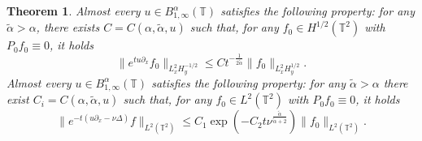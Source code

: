 \documentclass[11pt,oneside,reqno]{amsart}
\newtheorem{theorem}{Theorem}[section]
\numberwithin{equation}{section}
\begin{document}
\begin{theorem}
  Almost every $u \in B^{\alpha}_{1, \infty} (\mathbb{T})$ satisfies the
  following property: for any $\tilde{\alpha} > \alpha$, there exists $C = C
  (\alpha, \tilde{\alpha}, u)$ such that, for any $f_0 \in H^{1 / 2}
  (\mathbb{T}^2)$ with $P_0 f_0 \equiv 0$, it holds
  \begin{equation}
    \| e^{t u \partial_x} f_0 \|_{{L^2_x}  H^{- 1 / 2}_y} \leqslant C t^{-
    \frac{1}{2 \tilde{\alpha}}} \| f_0 \|_{L^2_x H^{1 / 2}_y} .
    \label{eq:final-thm-eq1}
  \end{equation}
  Almost every $u \in B^{\alpha}_{1, \infty} (\mathbb{T})$ satisfies the
  following property: for any $\tilde{\alpha} > \alpha$ there exist $C_i = C
  (\alpha, \tilde{\alpha}, u)$ such that, for any $f_0 \in L^2 (\mathbb{T}^2)$
  with $P_0 f_0 \equiv 0$, it holds
  \begin{equation}
    \| e^{- t (u \partial_x - \nu \Delta)} f \|_{L^2 (\mathbb{T}^2)} \leqslant
    C_1 \exp \left( - C_2 t \nu^{\frac{\tilde{\alpha}}{\tilde{\alpha} + 2}}
    \right) \| f_0 \|_{L^2 (\mathbb{T}^2)} . \label{eq:final-thm-eq2}
  \end{equation}
\end{theorem}
\end{document}

